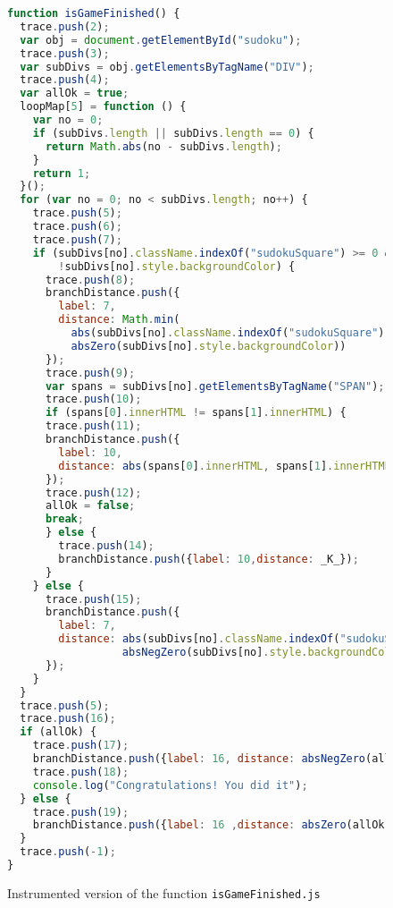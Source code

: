 \documentclass[sigconf]{acmart}
\begin{document}
\begin{figure}[t]
  \begin{lstlisting}[style=htmlcssjs,language=JavaScript]
function isGameFinished() {
  trace.push(2);
  var obj = document.getElementById("sudoku");
  trace.push(3);
  var subDivs = obj.getElementsByTagName("DIV");
  trace.push(4);
  var allOk = true;
  loopMap[5] = function () {
    var no = 0;
    if (subDivs.length || subDivs.length == 0) {
      return Math.abs(no - subDivs.length);
    }
    return 1;
  }();
  for (var no = 0; no < subDivs.length; no++) {
    trace.push(5);
    trace.push(6);
    trace.push(7);
    if (subDivs[no].className.indexOf("sudokuSquare") >= 0 &&
        !subDivs[no].style.backgroundColor) {
      trace.push(8);
      branchDistance.push({ 
        label: 7, 
        distance: Math.min(
          abs(subDivs[no].className.indexOf("sudokuSquare"), 0) + _K_,
          absZero(subDivs[no].style.backgroundColor))
      });
      trace.push(9);
      var spans = subDivs[no].getElementsByTagName("SPAN");
      trace.push(10);
      if (spans[0].innerHTML != spans[1].innerHTML) {
      trace.push(11);
      branchDistance.push({
        label: 10,
        distance: abs(spans[0].innerHTML, spans[1].innerHTML)
      });
      trace.push(12);
      allOk = false;
      break;
      } else {
        trace.push(14);
        branchDistance.push({label: 10,distance: _K_});
      }
    } else {
      trace.push(15);
      branchDistance.push({
        label: 7,
        distance: abs(subDivs[no].className.indexOf("sudokuSquare"), 0) +
                  absNegZero(subDivs[no].style.backgroundColor)
      });
    }
  }
  trace.push(5);
  trace.push(16);
  if (allOk) {
    trace.push(17);
    branchDistance.push({label: 16, distance: absNegZero(allOk)});
    trace.push(18);
    console.log("Congratulations! You did it");
  } else {
    trace.push(19);
    branchDistance.push({label: 16 ,distance: absZero(allOk)});
  }
  trace.push(-1);
}
\end{lstlisting}
  \caption{Instrumented version of the function \texttt{isGameFinished.js} }
  \label{code.isGameFinished.instr}
\end{figure}
\end{document}
